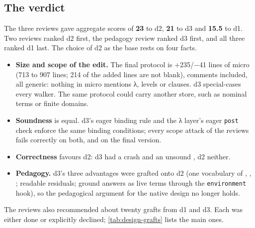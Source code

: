 \subsection{The verdict}\label{sec:design-verdict}

The three reviews gave aggregate scores of \textbf{23} to d2, \textbf{21} to d3 and \textbf{15.5} to
d1. Two reviews ranked d2 first, the pedagogy review ranked d3 first, and all three ranked d1 last. The
choice of d2 as the base rests on four facts.

\begin{itemize}
\item \textbf{Size and scope of the edit.} The final protocol is +235/−41 lines of micro (713 to 907
  lines; 214 of the added lines are not blank), comments included, all generic: nothing in micro mentions λ, levels or clauses. d3 special-cases every walker.
  The same protocol could carry another store, such as nominal terms or finite domains.
\item \textbf{Soundness} is equal. d3's eager binding rule and the λ layer's eager \texttt{post} check
  enforce the same binding conditions; every scope attack of the reviews fails correctly on both, and on
  the final version.
\item \textbf{Correctness} favours d2: d3 had a crash and an unsound , d2 neither.
\item \textbf{Pedagogy.} d3's three advantages were grafted onto d2 (one vocabulary of , ,
  ; readable residuals; ground answers as live terms through the \texttt{environment} hook), so
  the pedagogical argument for the native design no longer holds.
\end{itemize}

The reviews also recommended about twenty grafts from d1 and d3. Each was either done or explicitly
declined; \cref{tab:design-grafts} lists the main ones.

